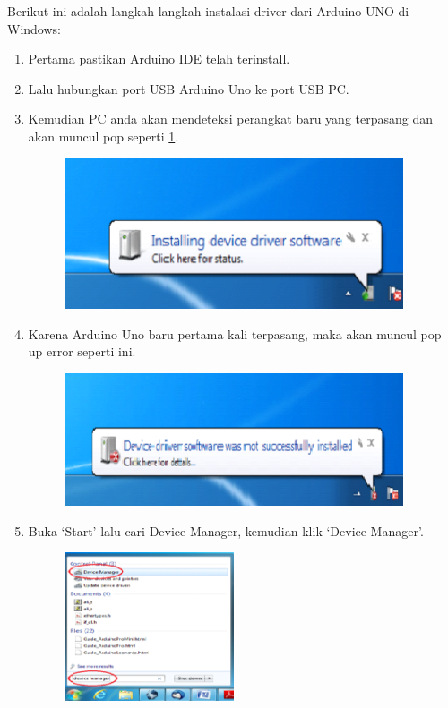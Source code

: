 Berikut ini adalah langkah-langkah instalasi driver dari Arduino UNO di Windows:
\begin{enumerate}
	\item Pertama pastikan Arduino IDE telah terinstall.
	\item Lalu hubungkan port USB Arduino Uno ke port USB PC.
	\item Kemudian PC anda akan mendeteksi perangkat baru yang terpasang dan akan muncul pop seperti \ref{1}.
	\begin{figure}[H]
		\includegraphics[width=10cm]{figures/5/1144124/Teori/1.png}
		\centering
        \label{1}
	\end{figure}
\item Karena Arduino Uno baru pertama kali terpasang, maka akan muncul pop up error seperti ini.
	\begin{figure}[H]
		\includegraphics[width=10cm]{figures/5/1144124/Teori/2.png}
		\centering
	\end{figure}
\item Buka `Start' lalu cari Device Manager, kemudian klik `Device Manager'.
	\begin{figure}[H]
		\includegraphics[width=5cm]{figures/5/1144124/Teori/3.png}
		\centering
	\end{figure}

\end{enumerate}
